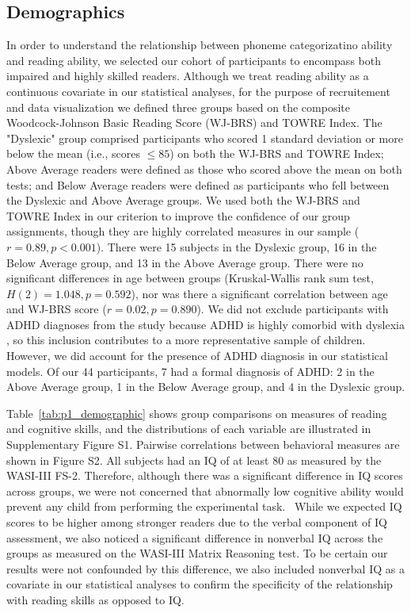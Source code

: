 \documentclass[../uwthesis.tex]{subfiles}
\begin{document}
\subsection{Demographics}

In order to understand the relationship between phoneme categorizatino ability and reading ability, we selected our cohort of participants to encompass both impaired and highly skilled readers. Although we treat reading ability as a continuous covariate in our statistical analyses, for the purpose of recruitement and data visualization we defined three groups based on the composite Woodcock-Johnson Basic Reading Score (WJ-BRS) and TOWRE Index. The "Dyslexic" group comprised participants who scored 1 standard deviation or more below the mean (i.e., scores $\leq 85$) on both the WJ-BRS and TOWRE Index; Above Average readers were defined as those who scored above the mean on both tests; and Below Average readers were defined as participants who fell between the Dyslexic and Above Average groups. We used both the WJ-BRS and TOWRE Index in our criterion to improve the confidence of our group assignments, though they are highly correlated measures in our sample ($r=0.89,p<0.001$). There were 15 subjects in the Dyslexic group, 16 in the Below Average group, and 13 in the Above Average group. There were no significant differences in age between groups (Kruskal-Wallis rank sum test, $H(2)=1.048,p=0.592$), nor was there a significant correlation between age and WJ-BRS score ($r=0.02,p=0.890$). We did not exclude participants with ADHD diagnoses from the study because ADHD is highly comorbid with dyslexia \cite{Light1995ReadingEtiology,Stevenson2005AttentionGene}, so this inclusion contributes to a more representative sample of children. However, we did account for the presence of ADHD diagnosis in our statistical models. Of our 44 participants, 7 had a formal diagnosis of ADHD: 2 in the Above Average group, 1 in the Below Average group, and 4 in the Dyslexic group. 

Table~\ref{tab:p1_demographic} shows group comparisons on measures of reading and cognitive skills, and the distributions of each variable are illustrated in Supplementary Figure S1. Pairwise correlations between behavioral measures are shown in Figure S2. All subjects had an IQ of at least 80 as measured by the WASI-III FS-2. Therefore, although there was a significant difference in IQ scores across groups, we were not concerned that abnormally low cognitive ability would prevent any child from performing the experimental task.  While we expected IQ scores to be higher among stronger readers due to the verbal component of IQ assessment, we also noticed a significant difference in nonverbal IQ across the groups as measured on the WASI-III Matrix Reasoning test. To be certain our results were not confounded by this difference, we also included nonverbal IQ as a covariate in our statistical analyses to confirm the specificity of the relationship with reading skills as opposed to IQ.
\end{document}
